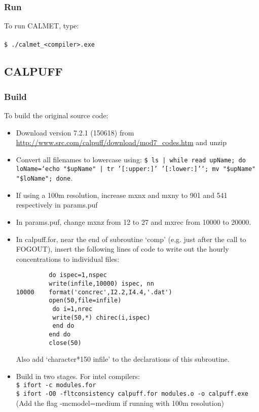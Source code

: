 \documentclass[10pt,a4paper]{article}
\newcommand\tab[1][0.5cm]{\hspace*{#1}}
\begin{document}
\subsubsection{Run}
To run CALMET, type:\\\\
\tab \texttt{\$ ./calmet\_<compiler>.exe}


\subsection{CALPUFF}
\subsubsection{Build}
To build the original source code:
\begin{itemize}
\item Download version 7.2.1 (150618) from \url{http://www.src.com/calpuff/download/mod7_codes.htm} and unzip
\item Convert all filenames to lowercase using: \texttt{\$ ls | while read upName; do loName=`echo "\${upName}" | tr '[:upper:]' '[:lower:]'`; mv "\$upName" "\$loName"; done}.
\item If using a 100m resolution, increase mxnx and mxny to 901 and 541 respectively in params.puf
\item In params.puf, change mxnz from 12 to 27 and mxrec from 10000 to 20000.
\item In calpuff.for, near the end of subroutine `comp' (e.g. just after the call to FOGOUT), insert the following lines of code to write out the hourly concentrations to individual files:\\
\begin{lstlisting}
         do ispec=1,nspec
         write(infile,10000) ispec, nn
10000    format('concrec',I2.2,I4.4,'.dat')
         open(50,file=infile)
          do i=1,nrec
          write(50,*) chirec(i,ispec)
          end do
         end do
         close(50)
\end{lstlisting}
Also add `character*150 infile' to the declarations of this subroutine.
\item Build in two stages. For intel compilers:\\
\tab \texttt{\$ ifort -c modules.for}\\
\tab \texttt{\$ ifort -O0 -fltconsistency calpuff.for modules.o -o calpuff.exe}
\tab (Add the flag -mcmodel=medium if running with 100m resolution)
\end{itemize}
\end{document}
